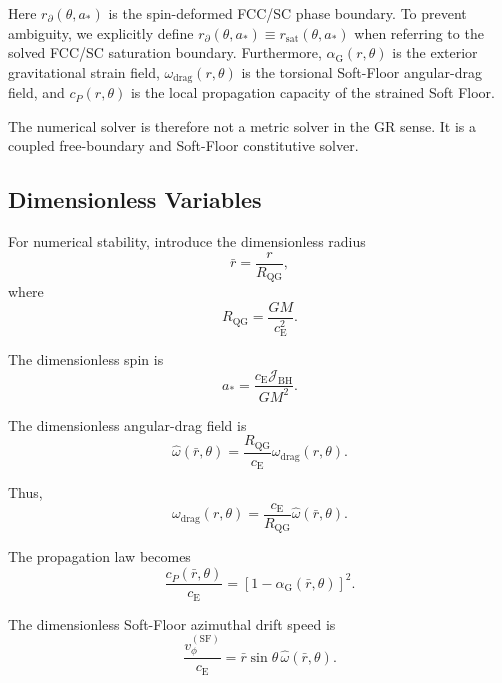 Here $r_{\partial}(\theta,a_\ast)$ is the spin-deformed FCC/SC phase boundary. To prevent ambiguity, we explicitly define $r_{\partial}(\theta,a_\ast) \equiv r_{\mathrm{sat}}(\theta,a_\ast)$ when referring to the solved FCC/SC saturation boundary. Furthermore, $\alpha_{\mathrm{G}}(r,\theta)$ is the exterior gravitational strain field, $\omega_{\mathrm{drag}}(r,\theta)$ is the torsional Soft-Floor angular-drag field, and $c_P(r,\theta)$ is the local propagation capacity of the strained Soft Floor.

The numerical solver is therefore not a metric solver in the GR sense. It is a coupled free-boundary and Soft-Floor constitutive solver.

\subsection{Dimensionless Variables}

For numerical stability, introduce the dimensionless radius
\begin{equation}
    \bar{r} = \frac{r}{R_{\mathrm{QG}}},
\end{equation}
where
\begin{equation}
    R_{\mathrm{QG}} = \frac{GM}{c_{\mathrm{E}}^2}.
\end{equation}

The dimensionless spin is
\begin{equation}
    a_\ast = \frac{c_{\mathrm{E}}\mathcal{J}_{\mathrm{BH}}}{GM^2}.
\end{equation}

The dimensionless angular-drag field is
\begin{equation}
    \widehat{\omega}(\bar{r},\theta) = \frac{R_{\mathrm{QG}}}{c_{\mathrm{E}}} \omega_{\mathrm{drag}}(r,\theta).
\end{equation}

Thus,
\begin{equation}
    \omega_{\mathrm{drag}}(r,\theta) = \frac{c_{\mathrm{E}}}{R_{\mathrm{QG}}} \widehat{\omega}(\bar{r},\theta).
\end{equation}

The propagation law becomes
\begin{equation}
    \boxed{ \frac{c_P(\bar{r},\theta)}{c_{\mathrm{E}}} = \left[ 1-\alpha_{\mathrm{G}}(\bar{r},\theta) \right]^2. }
\end{equation}

The dimensionless Soft-Floor azimuthal drift speed is
\begin{equation}
    \frac{v_{\phi}^{(\mathrm{SF})}}{c_{\mathrm{E}}} = \bar{r}\sin\theta \, \widehat{\omega}(\bar{r},\theta).
\end{equation}

